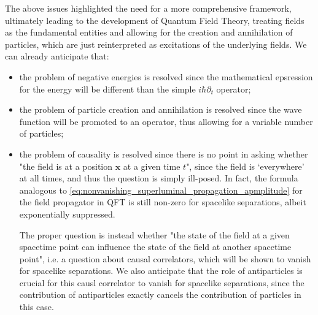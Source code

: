 \documentclass[../QFT_main.tex]{subfiles}
\begin{document}
\begin{mytheorem}
The above issues highlighted the need for a more comprehensive framework, ultimately leading to the development of Quantum Field Theory, treating fields as the fundamental entities and allowing for the creation and annihilation of particles, which are just reinterpreted as excitations of the underlying fields.
We can already anticipate that:
\begin{itemize}
    \item the problem of negative energies is resolved since the mathematical epsression for the energy will be different than the simple $i\hbar\partial_t$ operator;
    \item the problem of particle creation and annihilation is resolved since the wave function will be promoted to an operator, thus allowing for a variable number of particles;
    \item the problem of causality is resolved since there is no point in asking whether "the field is at a position $\mathbf{x}$ at a given time $t$", since the field is `everywhere' at all times, and thus the question is simply ill-posed.
    In fact, the formula analogous to \eqref{eq:nonvanishing_superluminal_propagation_apmplitude} for the field propagator in QFT is still non-zero for spacelike separations, albeit exponentially suppressed.

    The proper question is instead whether "the state of the field at a given spacetime point can influence the state of the field at another spacetime point", i.e. a question about causal correlators, which will be shown to vanish for spacelike separations.
    We also anticipate that the role of antiparticles is crucial for this causl correlator to vanish for spacelike separations, since the contribution of antiparticles exactly cancels the contribution of particles in this case.
\end{itemize}
\end{mytheorem}
\end{document}
